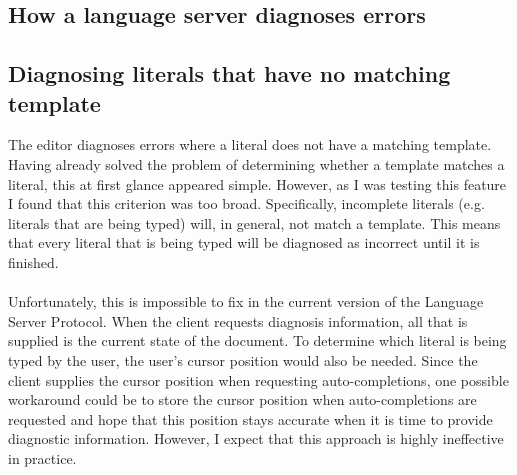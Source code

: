 \documentclass[../main.tex]{subfiles}
\begin{document}
\subsection{How a language server diagnoses errors}

\subsection{Diagnosing literals that have no matching template}
The editor diagnoses errors where a literal does not have a matching template. Having already solved the problem of determining whether a template matches a literal, this at first glance appeared simple.
However, as I was testing this feature I found that this criterion was too broad. Specifically, incomplete literals (e.g. literals that are being typed) will, in general, not match a template. This means that every literal that is being typed will be diagnosed as incorrect until it is finished. 
\\
\\
Unfortunately, this is impossible to fix in the current version of the Language Server Protocol. When the client requests diagnosis information, all that is supplied is the current state of the document. To determine which literal is being typed by the user, the user's cursor position would also be needed. Since the client supplies the cursor position when requesting auto-completions, one possible workaround could be to store the cursor position when auto-completions are requested and hope that this position stays accurate when it is time to provide diagnostic information. However, I expect that this approach is highly ineffective in practice.
\end{document}
